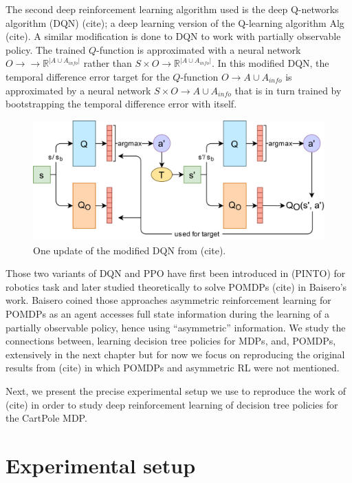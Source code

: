 The second deep reinforcement learning algorithm used is the deep Q-networks algorithm (DQN) (cite); a deep learning version of the Q-learning algorithm Alg (cite).
A similar modification is done to DQN to work with partially observable policy. The trained $Q$-function is approximated with a neural network $O\rightarrow \rightarrow \mathbb{R}^{|A\cup A_{info}|}$ rather than $S\times O\rightarrow \mathbb{R}^{|A\cup A_{info}|}$.
In this modified DQN, the temporal difference error target for the $Q$-function $O\rightarrow A\cup A_{info}$ is approximated by a neural network $S\times O\rightarrow A\cup A_{info}$ that is in turn trained by bootstrapping the temporal difference error with itself.

\begin{figure}
\includegraphics[width=1\textwidth]{images/images_part1/mnamenew.png}
\caption{One update of the modified DQN from (cite).}
\end{figure}

Those two variants of DQN and PPO have first been introduced in (PINTO) for robotics task and later studied theoretically to solve POMDPs (cite) in Baisero's work.
Baisero coined those approaches asymmetric reinforcement learning for POMDPs as an agent accesses full state information during the learning of a partially observable policy, hence using ``asymmetric'' information.
We study the connections between, learning decision tree policies for MDPs, and, POMDPs, extensively in the next chapter but for now we focus on reproducing the original results from (cite) in which POMDPs and asymmetric RL were not mentioned. 

Next, we present the precise experimental setup we use to reproduce the work of (cite) in order to study deep reinforcement learning of decision tree policies for the CartPole MDP.

\section{Experimental setup}
